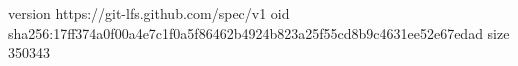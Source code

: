 version https://git-lfs.github.com/spec/v1
oid sha256:17ff374a0f00a4e7c1f0a5f86462b4924b823a25f55cd8b9c4631ee52e67edad
size 350343
